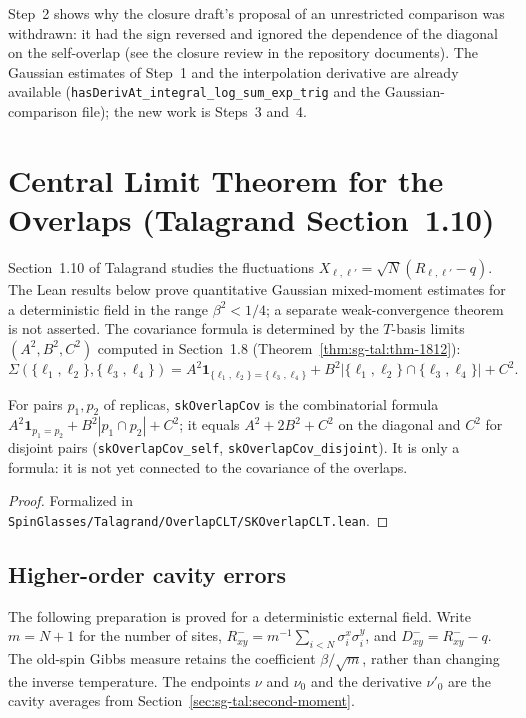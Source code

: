 \begin{remark}
\begin{enumerate}
\end{enumerate}
Step~2 shows why the closure draft's proposal of an unrestricted comparison was withdrawn: it had the sign reversed and ignored the dependence of the diagonal on the self-overlap (see the closure review in the repository documents). The Gaussian estimates of Step~1 and the interpolation derivative are already available (\texttt{hasDerivAt\_integral\_log\_sum\_exp\_trig} and the Gaussian-comparison file); the new work is Steps~3 and~4.
\end{remark}

\section{Central Limit Theorem for the Overlaps (Talagrand Section~1.10)}\label{sec:sg-tal:overlap-clt}

Section~1.10 of Talagrand studies the fluctuations $X_{\ell,\ell\prime}=\sqrt N(R_{\ell,\ell\prime}-q)$. The Lean results below prove quantitative Gaussian mixed-moment estimates for a deterministic field in the range $\beta^2<1/4$; a separate weak-convergence theorem is not asserted. The covariance formula is determined by the $T$-basis limits $(A^2,B^2,C^2)$ computed in Section~1.8 (Theorem~\ref{thm:sg-tal:thm-1812}):
$$\Sigma(\{\ell_1, \ell_2\}, \{\ell_3, \ell_4\}) = A^2 \mathbf{1}_{\{\ell_1, \ell_2\} = \{\ell_3, \ell_4\}} + B^2 |\{\ell_1, \ell_2\} \cap \{\ell_3, \ell_4\}| + C^2.$$

\begin{theorem}\label{thm:sg-tal:overlap-cov}
\leanok
{}
For pairs $p_1,p_2$ of replicas, \texttt{skOverlapCov} is the combinatorial formula $A^2\mathbf 1_{p_1=p_2}+B^2|p_1\cap p_2|+C^2$; it equals $A^2+2B^2+C^2$ on the diagonal and $C^2$ for disjoint pairs (\texttt{skOverlapCov\_self}, \texttt{skOverlapCov\_disjoint}). It is only a formula: it is not yet connected to the covariance of the overlaps.
\end{theorem}
\begin{proof}
\leanok
Formalized in \texttt{SpinGlasses/Talagrand/OverlapCLT/SKOverlapCLT.lean}.
\end{proof}

\subsection{Higher-order cavity errors}

The following preparation is proved for a deterministic external field. Write $m=N+1$
for the number of sites, $R^-_{xy}=m^{-1}\sum_{i<N}\sigma_i^x\sigma_i^y$,
and $D^-_{xy}=R^-_{xy}-q$. The old-spin Gibbs measure retains the coefficient
$\beta/\sqrt m$, rather than changing the inverse temperature. The endpoints $\nu$
and $\nu_0$ and the derivative $\nu'_0$ are the cavity averages from
Section~\ref{sec:sg-tal:second-moment}.

